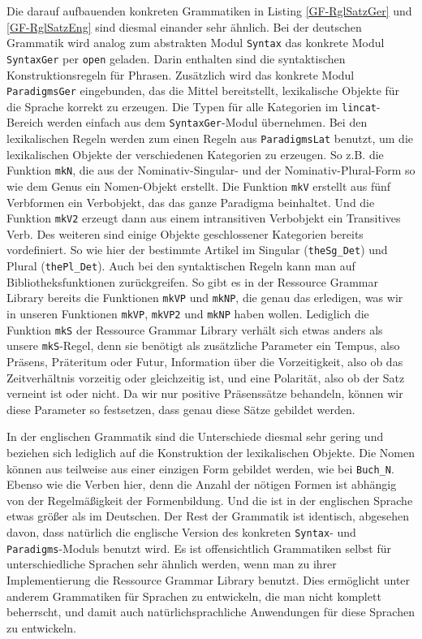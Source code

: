 Die darauf aufbauenden konkreten Grammatiken in Listing \ref{GF-RglSatzGer} und \ref{GF-RglSatzEng} sind diesmal einander sehr ähnlich. Bei der deutschen Grammatik wird analog zum abstrakten Modul \texttt{Syntax} das konkrete Modul \texttt{SyntaxGer} per \texttt{open} geladen. Darin enthalten sind die syntaktischen Konstruktionsregeln für Phrasen. Zusätzlich wird das konkrete Modul \texttt{ParadigmsGer} eingebunden, das die Mittel bereitstellt, lexikalische Objekte für die Sprache korrekt zu erzeugen. Die Typen für alle Kategorien im \texttt{lincat}-Bereich werden einfach aus dem \texttt{SyntaxGer}-Modul übernehmen. Bei den lexikalischen Regeln werden zum einen Regeln aus \texttt{ParadigmsLat} benutzt, um die lexikalischen Objekte der verschiedenen Kategorien zu erzeugen. So z.B. die Funktion \texttt{mkN}, die aus der Nominativ-Singular- und der Nominativ-Plural-Form so wie dem Genus ein Nomen-Objekt erstellt. Die Funktion \texttt{mkV} erstellt aus fünf Verbformen ein Verbobjekt, das das ganze Paradigma beinhaltet. Und die Funktion \texttt{mkV2} erzeugt dann aus einem intransitiven Verbobjekt ein Transitives Verb. Des weiteren sind einige Objekte geschlossener Kategorien bereits vordefiniert. So wie hier der bestimmte Artikel im Singular (\texttt{theSg\_Det}) und Plural (\texttt{thePl\_Det}). Auch bei den syntaktischen Regeln kann man auf Bibliotheksfunktionen zurückgreifen. So gibt es in der Ressource Grammar Library bereits die Funktionen \texttt{mkVP} und \texttt{mkNP}, die genau das erledigen, was wir in unseren Funktionen \texttt{mkVP}, \texttt{mkVP2} und \texttt{mkNP} haben wollen. Lediglich die Funktion \texttt{mkS} der Ressource Grammar Library verhält sich etwas anders als unsere \texttt{mkS}-Regel, denn sie benötigt als zusätzliche Parameter ein Tempus, also Präsens, Präteritum oder Futur, Information über die Vorzeitigkeit, also ob das Zeitverhältnis vorzeitig oder gleichzeitig ist, und eine Polarität, also ob der Satz verneint ist oder nicht. Da wir nur positive Präsenssätze behandeln, können wir diese Parameter so festsetzen, dass genau diese Sätze gebildet werden. \par

In der englischen Grammatik sind die Unterschiede diesmal sehr gering und beziehen sich lediglich auf die Konstruktion der lexikalischen Objekte. Die Nomen können aus teilweise aus einer einzigen Form gebildet werden, wie bei \texttt{Buch\_N}. Ebenso wie die Verben hier, denn die Anzahl der nötigen Formen ist abhängig von der Regelmäßigkeit der Formenbildung. Und die ist in der englischen Sprache etwas größer als im Deutschen. Der Rest der Grammatik ist identisch, abgesehen davon, dass natürlich die englische Version des konkreten \texttt{Syntax}- und \texttt{Paradigms}-Moduls benutzt wird. Es ist offensichtlich Grammatiken selbst für unterschiedliche Sprachen sehr ähnlich werden, wenn man zu ihrer Implementierung die Ressource Grammar Library benutzt. Dies ermöglicht unter anderem Grammatiken für Sprachen zu entwickeln, die man nicht komplett beherrscht, und damit auch natürlichsprachliche Anwendungen für diese Sprachen zu entwickeln.